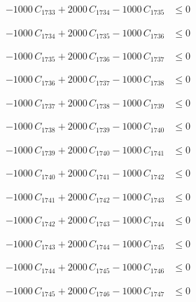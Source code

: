 \documentclass[a4paper,11pt]{article}
\begin{document}
\begin{align}
-1000\,C_{1733} + 2000\,C_{1734} - 1000\,C_{1735} &\leq 0 \nonumber
\end{align}

\begin{align}
-1000\,C_{1734} + 2000\,C_{1735} - 1000\,C_{1736} &\leq 0 \nonumber
\end{align}

\begin{align}
-1000\,C_{1735} + 2000\,C_{1736} - 1000\,C_{1737} &\leq 0 \nonumber
\end{align}

\begin{align}
-1000\,C_{1736} + 2000\,C_{1737} - 1000\,C_{1738} &\leq 0 \nonumber
\end{align}

\begin{align}
-1000\,C_{1737} + 2000\,C_{1738} - 1000\,C_{1739} &\leq 0 \nonumber
\end{align}

\begin{align}
-1000\,C_{1738} + 2000\,C_{1739} - 1000\,C_{1740} &\leq 0 \nonumber
\end{align}

\begin{align}
-1000\,C_{1739} + 2000\,C_{1740} - 1000\,C_{1741} &\leq 0 \nonumber
\end{align}

\begin{align}
-1000\,C_{1740} + 2000\,C_{1741} - 1000\,C_{1742} &\leq 0 \nonumber
\end{align}

\begin{align}
-1000\,C_{1741} + 2000\,C_{1742} - 1000\,C_{1743} &\leq 0 \nonumber
\end{align}

\begin{align}
-1000\,C_{1742} + 2000\,C_{1743} - 1000\,C_{1744} &\leq 0 \nonumber
\end{align}

\begin{align}
-1000\,C_{1743} + 2000\,C_{1744} - 1000\,C_{1745} &\leq 0 \nonumber
\end{align}

\begin{align}
-1000\,C_{1744} + 2000\,C_{1745} - 1000\,C_{1746} &\leq 0 \nonumber
\end{align}

\begin{align}
-1000\,C_{1745} + 2000\,C_{1746} - 1000\,C_{1747} &\leq 0 \nonumber
\end{align}
\end{document}

